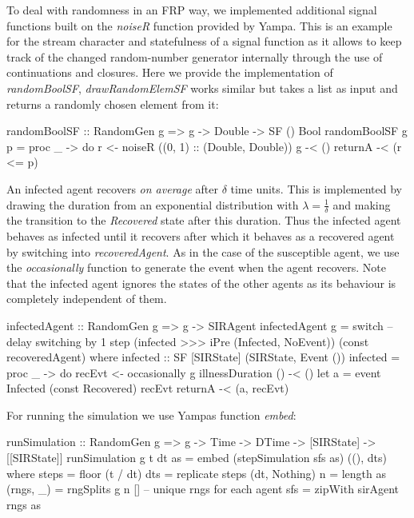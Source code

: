 To deal with randomness in an FRP way, we implemented additional signal functions built on the \textit{noiseR} function provided by Yampa. This is an example for the stream character and statefulness of a signal function as it allows to keep track of the changed random-number generator internally through the use of continuations and closures. Here we provide the implementation of \textit{randomBoolSF}, \textit{drawRandomElemSF} works similar but takes a list as input and returns a randomly chosen element from it:

\begin{HaskellCode}
randomBoolSF :: RandomGen g => g -> Double -> SF () Bool
randomBoolSF g p = proc _ -> do
  r <- noiseR ((0, 1) :: (Double, Double)) g -< ()
  returnA -< (r <= p)
\end{HaskellCode}

An infected agent recovers \textit{on average} after $\delta$ time units. This is implemented by drawing the duration from an exponential distribution \cite{borshchev_system_2004} with $\lambda = \frac{1}{\delta}$ and making the transition to the \textit{Recovered} state after this duration. Thus the infected agent behaves as infected until it recovers after which it behaves as a recovered agent by switching into \textit{recoveredAgent}. As in the case of the susceptible agent, we use the \textit{occasionally} function to generate the event when the agent recovers. Note that the infected agent ignores the states of the other agents as its behaviour is completely independent of them.

\begin{HaskellCode}
infectedAgent :: RandomGen g => g -> SIRAgent
infectedAgent g 
    = switch 
      -- delay switching by 1 step 
      (infected >>> iPre (Infected, NoEvent))
      (const recoveredAgent)
  where
    infected :: SF [SIRState] (SIRState, Event ())
    infected = proc _ -> do
      recEvt <- occasionally g illnessDuration () -< ()
      let a = event Infected (const Recovered) recEvt
      returnA -< (a, recEvt)
\end{HaskellCode}

For running the simulation we use Yampas function \textit{embed}:

\begin{HaskellCode}
runSimulation :: RandomGen g => g -> Time -> DTime -> [SIRState] -> [[SIRState]]
runSimulation g t dt as 
    = embed (stepSimulation sfs as) ((), dts)
  where
    steps     = floor (t / dt)
    dts       = replicate steps (dt, Nothing)
    n         = length as
    (rngs, _) = rngSplits g n [] -- unique rngs for each agent
    sfs       = zipWith sirAgent rngs as
\end{HaskellCode}


